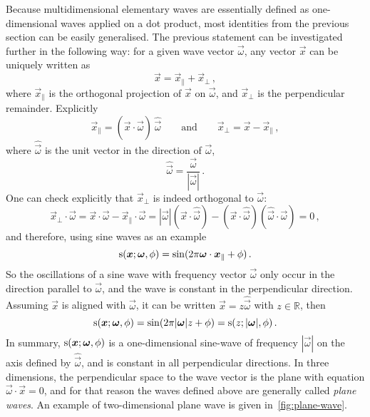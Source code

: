 Because multidimensional elementary waves are essentially defined as one-dimensional waves
applied on a dot product, most identities from the previous section can be easily
generalised. The previous statement can be investigated further in the following way: for
a given wave vector $\vec{\omega}$, any vector $\vec{x}$ can be uniquely written as
\begin{equation}
  \vec{x}=\vec{x}_{\parallel}+\vec{x}_{\perp}\,,
\end{equation}
where $\vec{x}_{\parallel}$ is the orthogonal projection of $\vec{x}$ on $\vec{\omega}$,
and $\vec{x}_{\perp}$ is the perpendicular remainder. Explicitly
\begin{equation}
  \vec{x}_{\parallel}=(\vec{x}\cdot\hat{\vec{\omega}})\,\hat{\vec{\omega}}
  \qquad\text{and}\qquad
  \vec{x}_{\perp}=\vec{x}-\vec{x}_{\parallel}\,,
\end{equation}
where $\hat{\vec{\omega}}$ is the unit vector in the direction of $\vec{\omega}$, \ie
\begin{equation}
  \hat{\vec{\omega}}=\frac{\vec{\omega}}{|\vec{\omega}|}\,.
\end{equation}
One can check explicitly that $\vec{x}_{\perp}$ is indeed orthogonal to $\vec{\omega}$:
\begin{equation}
  \vec{x}_{\perp}\cdot\vec{\omega}
  =\vec{x}\cdot\vec{\omega}-\vec{x}_{\parallel}\cdot\vec{\omega}
  =|\vec{\omega}|(\vec{x}\cdot\hat{\vec{\omega}})
  -(\vec{x}\cdot\hat{\vec{\omega}})(\hat{\vec{\omega}}\cdot\vec{\omega})=0\,,
\end{equation}
and therefore, using sine waves as an example
\begin{equation}
  \operatorname{s}(\bm{x};\bm{\omega},\phi)=\sin(2\pi\bm{\omega}\cdot\bm{x}_{\parallel}+\phi)\,.
\end{equation}
So the oscillations of a sine wave with frequency vector $\vec{\omega}$ only occur in the
direction parallel to $\vec{\omega}$, and the wave is constant in the perpendicular
direction. Assuming $\vec{x}$ is aligned with $\vec{\omega}$, \ie it can be written
$\vec{x}=z\hat{\vec{\omega}}$ with $z\in\mathbb{R}$, then
\begin{equation}
  \operatorname{s}(\bm{x};\bm{\omega},\phi)=\sin(2\pi|\bm{\omega}|z+\phi)
  =\operatorname{s}(z;|\bm{\omega}|,\phi)\,.
\end{equation}
In summary, $\operatorname{s}(\bm{x};\bm{\omega},\phi)$ is a one-dimensional sine-wave of frequency
$|\vec{\omega}|$ on the axis defined by $\hat{\vec{\omega}}$, and is constant in all
perpendicular directions. In three dimensions, the perpendicular space to the wave vector
is the plane with equation $\vec{\omega}\cdot\vec{x}=0$, and for that reason the waves
defined above are generally called \emph{plane waves}. An example of two-dimensional plane
wave is given in~\cref{fig:plane-wave}.

